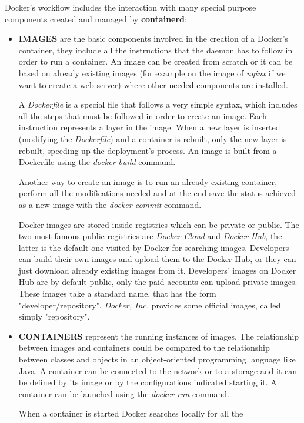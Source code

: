 \documentclass[a4paper,12pt]{article}
\begin{document}
Docker's workflow includes the interaction with many special purpose components
created and managed by \textbf{containerd}:
\begin{itemize}
  \item \textbf{IMAGES} are the basic components involved in the creation of a
  Docker's container, they include all the instructions that the daemon has to
  follow in order to run a container. An image can be created from scratch or it
  can be based on already existing images (for example on the image of
  \textit{nginx} if we want to create a web server) where other needed
  components are installed. \par A \textit{Dockerfile} is a special file that
  follows a very simple syntax, which includes all the steps that must be
  followed in order to create an image. Each instruction represents a layer in
  the image. When a new layer is inserted (modifying the \textit{Dockerfile})
  and a container is rebuilt, only the new layer is rebuilt, speeding up the
  deployment's process. An image is built from a Dockerfile using the
  \textit{docker build} command. \par Another way to create an image is to run
  an already existing container, perform all the modifications needed and at the
  end save the status achieved as a new image with the \textit{docker commit}
  command.\par Docker images are stored inside registries which can be private
  or public. The two most famous public registries are \textit{Docker Cloud} and
  \textit{Docker Hub}, the latter is the default one visited by Docker for
  searching images. Developers can build their own images and upload them to the
  Docker Hub, or they can just download already existing images from it.
  Developers' images on Docker Hub are by default public, only the paid accounts
  can upload private images. These images take a standard name, that has the
  form "developer/repository". \textit{Docker, Inc.} provides some official
  images, called simply "repository".  
  \item \textbf{CONTAINERS} represent the running instances of images. The
  relationship between images and containers could be compared to the
  relationship between classes and objects in an object-oriented programming
  language like Java. A container can be connected to the network or to a
  storage and it can be defined by its image or by the configurations indicated
  starting it. A container can be launched using the \textit{docker run}
  command.\par When a container is started Docker searches locally for all the

\end{itemize}
\end{document}
